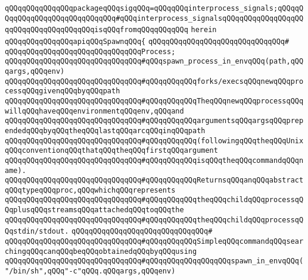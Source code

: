 \verb|qQQqqQQqqQQqqQQqpackageqQQqsigqQQq=qQQqqQQqinterprocess_signals;qQQqqQQqqQQqqQQqqQQqqQQqqQQqqQQq#qQQqinterprocess_signalsqQQqqQQqqQQqqQQqqQQqqQQqqQQqqQQqqQQqqQQqisqQQqfromqQQqqQQqqQQq|\newline
\verb|herein|\newline
\newline
\verb|qQQqqQQqqQQqqQQqapiqQQqSpawnqQQq{|\newline
\verb|qQQqqQQqqQQqqQQqqQQqqQQqqQQqqQQq#|\newline
\verb|qQQqqQQqqQQqqQQqqQQqqQQqqQQqqQQqProcess;|\newline
\newline
\verb|qQQqqQQqqQQqqQQqqQQqqQQqqQQqqQQq#qQQqspawn_process_in_envqQQq(path,qQQqargs,qQQqenv)|\newline
\verb|qQQqqQQqqQQqqQQqqQQqqQQqqQQqqQQq#qQQqqQQqqQQqforks/execsqQQqnewqQQqprocessqQQqgivenqQQqbyqQQqpath|\newline
\verb|qQQqqQQqqQQqqQQqqQQqqQQqqQQqqQQq#qQQqqQQqqQQqTheqQQqnewqQQqprocessqQQqwillqQQqhaveqQQqenvironmentqQQqenv,qQQqand|\newline
\verb|qQQqqQQqqQQqqQQqqQQqqQQqqQQqqQQq#qQQqqQQqqQQqargumentsqQQqargsqQQqprependedqQQqbyqQQqtheqQQqlastqQQqarcqQQqinqQQqpath|\newline
\verb|qQQqqQQqqQQqqQQqqQQqqQQqqQQqqQQq#qQQqqQQqqQQq(followingqQQqtheqQQqUnixqQQqconventionqQQqthatqQQqtheqQQqfirstqQQqargument|\newline
\verb|qQQqqQQqqQQqqQQqqQQqqQQqqQQqqQQq#qQQqqQQqqQQqisqQQqtheqQQqcommandqQQqname).|\newline
\verb|qQQqqQQqqQQqqQQqqQQqqQQqqQQqqQQq#qQQqqQQqqQQqReturnsqQQqanqQQqabstractqQQqtypeqQQqproc,qQQqwhichqQQqrepresents|\newline
\verb|qQQqqQQqqQQqqQQqqQQqqQQqqQQqqQQq#qQQqqQQqqQQqtheqQQqchildqQQqprocessqQQqplusqQQqstreamsqQQqattachedqQQqtoqQQqthe|\newline
\verb|qQQqqQQqqQQqqQQqqQQqqQQqqQQqqQQq#qQQqqQQqqQQqtheqQQqchildqQQqprocessqQQqstdin/stdout.|\newline
\verb|qQQqqQQqqQQqqQQqqQQqqQQqqQQqqQQq#|\newline
\verb|qQQqqQQqqQQqqQQqqQQqqQQqqQQqqQQq#qQQqqQQqqQQqSimpleqQQqcommandqQQqsearchingqQQqcanqQQqbeqQQqobtainedqQQqbyqQQqusing|\newline
\verb|qQQqqQQqqQQqqQQqqQQqqQQqqQQqqQQq#qQQqqQQqqQQqqQQqqQQqspawn_in_envqQQq("/bin/sh",qQQq"-c"qQQq.qQQqargs,qQQqenv)|\newline
